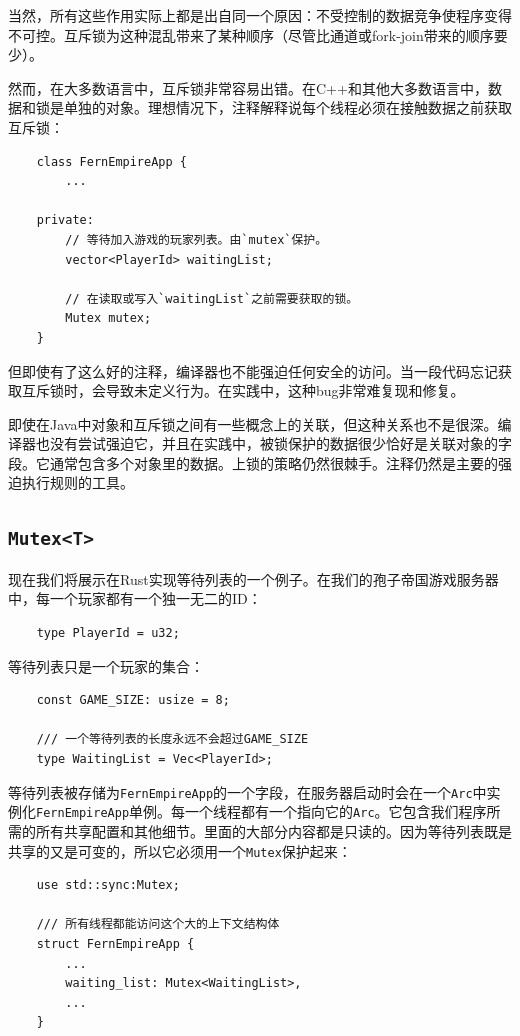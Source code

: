 当然，所有这些作用实际上都是出自同一个原因：不受控制的数据竞争使程序变得不可控。互斥锁为这种混乱带来了某种顺序（尽管比通道或fork-join带来的顺序要少）。

然而，在大多数语言中，互斥锁非常容易出错。在C++和其他大多数语言中，数据和锁是单独的对象。理想情况下，注释解释说每个线程必须在接触数据之前获取互斥锁：
\begin{verbatim}
    class FernEmpireApp {
        ...

    private:
        // 等待加入游戏的玩家列表。由`mutex`保护。
        vector<PlayerId> waitingList;

        // 在读取或写入`waitingList`之前需要获取的锁。
        Mutex mutex;
    }
\end{verbatim}

但即使有了这么好的注释，编译器也不能强迫任何安全的访问。当一段代码忘记获取互斥锁时，会导致未定义行为。在实践中，这种bug非常难复现和修复。

即使在Java中对象和互斥锁之间有一些概念上的关联，但这种关系也不是很深。编译器也没有尝试强迫它，并且在实践中，被锁保护的数据很少恰好是关联对象的字段。它通常包含多个对象里的数据。上锁的策略仍然很棘手。注释仍然是主要的强迫执行规则的工具。

\subsection{\texttt{Mutex<T>}}\label{mutex}
现在我们将展示在Rust实现等待列表的一个例子。在我们的孢子帝国游戏服务器中，每一个玩家都有一个独一无二的ID：
\begin{verbatim}
    type PlayerId = u32;
\end{verbatim}

等待列表只是一个玩家的集合：
\begin{verbatim}
    const GAME_SIZE: usize = 8;
    
    /// 一个等待列表的长度永远不会超过GAME_SIZE
    type WaitingList = Vec<PlayerId>;
\end{verbatim}

等待列表被存储为\texttt{FernEmpireApp}的一个字段，在服务器启动时会在一个\texttt{Arc}中实例化\texttt{FernEmpireApp}单例。每一个线程都有一个指向它的\texttt{Arc}。它包含我们程序所需的所有共享配置和其他细节。里面的大部分内容都是只读的。因为等待列表既是共享的又是可变的，所以它必须用一个\texttt{Mutex}保护起来：
\begin{verbatim}
    use std::sync:Mutex;

    /// 所有线程都能访问这个大的上下文结构体
    struct FernEmpireApp {
        ...
        waiting_list: Mutex<WaitingList>,
        ...
    }
\end{verbatim}


